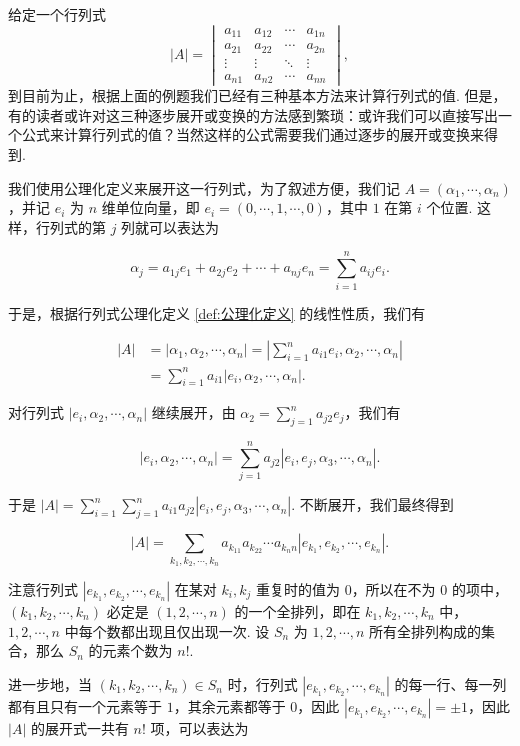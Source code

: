 给定一个行列式
\[|A| = \begin{vmatrix}
        a_{11} & a_{12} & \cdots & a_{1n} \\
        a_{21} & a_{22} & \cdots & a_{2n} \\
        \vdots & \vdots & \ddots & \vdots \\
        a_{n1} & a_{n2} & \cdots & a_{nn}
    \end{vmatrix},\]
到目前为止，根据上面的例题我们已经有三种基本方法来计算行列式的值. 但是，有的读者或许对这三种逐步展开或变换的方法感到繁琐：或许我们可以直接写出一个公式来计算行列式的值？当然这样的公式需要我们通过逐步的展开或变换来得到.

我们使用公理化定义来展开这一行列式，为了叙述方便，我们记 $A = (\alpha_1,\cdots,\alpha_n)$，并记 $e_i$ 为 $n$ 维单位向量，即 $e_i = (0,\cdots,1,\cdots,0)$，其中 $1$ 在第 $i$ 个位置. 这样，行列式的第 $j$ 列就可以表达为

\[\alpha_j = a_{1j}e_1 + a_{2j}e_2 + \cdots + a_{nj}e_n = \sum_{i=1}^{n}a_{ij}e_i.\]

于是，根据行列式公理化定义 \autoref{def:公理化定义} 的线性性质，我们有

\begin{align*}
    |A| &= |\alpha_1,\alpha_2,\cdots,\alpha_n| = |\sum\limits_{i=1}^{n}a_{i1}e_i,\alpha_2,\cdots,\alpha_n| \\
        &= \sum\limits_{i=1}^{n}a_{i1}|e_i,\alpha_2,\cdots,\alpha_n|.
\end{align*}

对行列式 $|e_i,\alpha_2,\cdots,\alpha_n|$ 继续展开，由 $\alpha_2 = \sum\limits_{j=1}^{n}a_{j2}e_j$，我们有

\[|e_i,\alpha_2,\cdots,\alpha_n| = \sum\limits_{j=1}^{n}a_{j2}|e_i,e_j,\alpha_3,\cdots,\alpha_n|.\]

于是 $|A| = \sum\limits_{i=1}^{n}\sum\limits_{j=1}^{n}a_{i1}a_{j2}|e_i,e_j,\alpha_3,\cdots,\alpha_n|$. 不断展开，我们最终得到

\[|A| = \sum\limits_{k_1,k_2,\cdots,k_n} a_{k_11}a_{k_22}\cdots a_{k_nn}|e_{k_1},e_{k_2},\cdots,e_{k_n}|.\]

注意行列式 $|e_{k_1},e_{k_2},\cdots,e_{k_n}|$ 在某对 $k_i,k_j$ 重复时的值为 $0$，所以在不为 $0$ 的项中，$(k_1,k_2,\cdots,k_n)$ 必定是 $(1,2,\cdots,n)$ 的一个全排列，即在 $k_1,k_2,\cdots,k_n$ 中，$1,2,\cdots,n$ 中每个数都出现且仅出现一次. 设 $S_n$ 为 $1,2,\cdots,n$ 所有全排列构成的集合，那么 $S_n$ 的元素个数为 $n!$.

进一步地，当 $(k_1,k_2,\cdots,k_n) \in S_n$ 时，行列式 $|e_{k_1},e_{k_2},\cdots,e_{k_n}|$ 的每一行、每一列都有且只有一个元素等于 $1$，其余元素都等于 $0$，因此 $|e_{k_1},e_{k_2},\cdots,e_{k_n}| = \pm 1$，因此 $|A|$ 的展开式一共有 $n!$ 项，可以表达为

